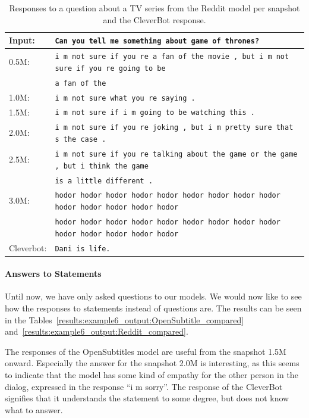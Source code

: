 \begin{table}[H]
	\centering
	\begin{adjustbox}{max width=\textwidth}
		\begin{tabularx}{\textwidth}{lX}
			\toprule
			Input: 	& \texttt{Can you tell me something about game of thrones?}\\
			\midrule
			0.5M: 	& \texttt{i m not sure if you re a fan of the movie , but i m not sure if you re going to be}\\
			& \texttt{a fan of the}\\
			1.0M: 	& \texttt{i m not sure what you re saying .}\\
			1.5M:	& \texttt{i m not sure if i m going to be watching this .}\\
			2.0M:	& \texttt{i m not sure if you re joking , but i m pretty sure that s the case .}\\
			2.5M:	& \texttt{i m not sure if you re talking about the game or the game , but i think the game}\\
			& \texttt{is a little different .}\\
			3.0M:	& \texttt{hodor hodor hodor hodor hodor hodor hodor hodor hodor hodor hodor hodor hodor hodor }\\
			& \texttt{hodor hodor hodor hodor hodor hodor hodor hodor hodor hodor hodor hodor hodor hodor}\\
			Cleverbot:	& \texttt{Dani is life.}\\
			\bottomrule
		\end{tabularx}
	\end{adjustbox}
	\caption{Responses to a question about a TV series from the Reddit model per snapshot and the CleverBot response.}
	\label{results:example5_output:Reddit_compared}
\end{table}

\paragraph{Answers to Statements}
Until now, we have only asked questions to our models. We would now like to see how the responses to statements instead of questions are. The results can be seen in the Tables~\ref{results:example6_output:OpenSubtitle_compared} and~\ref{results:example6_output:Reddit_compared}.

The responses of the OpenSubtitles model are useful from the snapshot 1.5M onward. Especially the answer for the snapshot 2.0M is interesting, as this seems to indicate that the model has some kind of empathy for the other person in the dialog, expressed in the response ``i m sorry''. The response of the CleverBot signifies that it understands the statement to some degree, but does not know what to answer.

